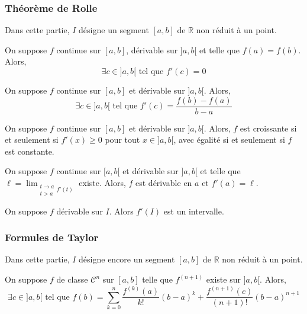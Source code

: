 	\subsubsection{Théorème de Rolle}

	Dans cette partie, $I$ désigne un segment $[a,b]$ de $\mathbb{R}$ non réduit à un point.

	\begin{theorem}[Rolle]
		On suppose $f$ continue sur $[a,b]$, dérivable sur $]a,b[$ et telle que $f(a) = f(b)$. Alors,
		\[ \exists c \in ]a,b[ \text{ tel que } f'(c) = 0 \]
	\end{theorem}

	\begin{theorem}
		On suppose $f$ continue sur $[a,b]$ et dérivable sur $]a,b[$. Alors,
		\[ \exists c \in ]a,b[ \text{ tel que } f'(c) = \frac{f(b) - f(a)}{b-a} \]
	\end{theorem}

	\begin{corollary}
		On suppose $f$ continue sur $[a,b]$ et dérivable sur $]a,b[$. Alors, $f$ est croissante si et seulement si $f'(x) \geq 0$ pour tout $x \in ]a,b[$, avec égalité si et seulement si $f$ est constante.
	\end{corollary}

	\begin{corollary}
		On suppose $f$ continue sur $[a,b[$ et dérivable sur $]a,b[$ et telle que $\ell = \lim_{\substack{t \rightarrow a \\ t > a} f'(t)}$ existe. Alors, $f$ est dérivable en $a$ et $f'(a) = \ell$.
	\end{corollary}


	\begin{theorem}[Darboux]
		On suppose $f$ dérivable sur $I$. Alors $f'(I)$ est un intervalle.
	\end{theorem}

	\subsubsection{Formules de Taylor}


	Dans cette partie, $I$ désigne encore un segment $[a,b]$ de $\mathbb{R}$ non réduit à un point.

	\begin{theorem}
		On suppose $f$ de classe $\mathcal{C}^n$ sur $[a,b]$ telle que $f^{(n+1)}$ existe sur $]a,b[$. Alors,
		\[ \exists c \in ]a,b[ \text{ tel que } f(b) = \sum_{k=0}^{n} \frac{f^{(k)} (a)}{k!} (b-a)^k + \frac{f^{(n+1)}(c)}{(n+1)!} (b-a)^{n+1} \]
	\end{theorem}

